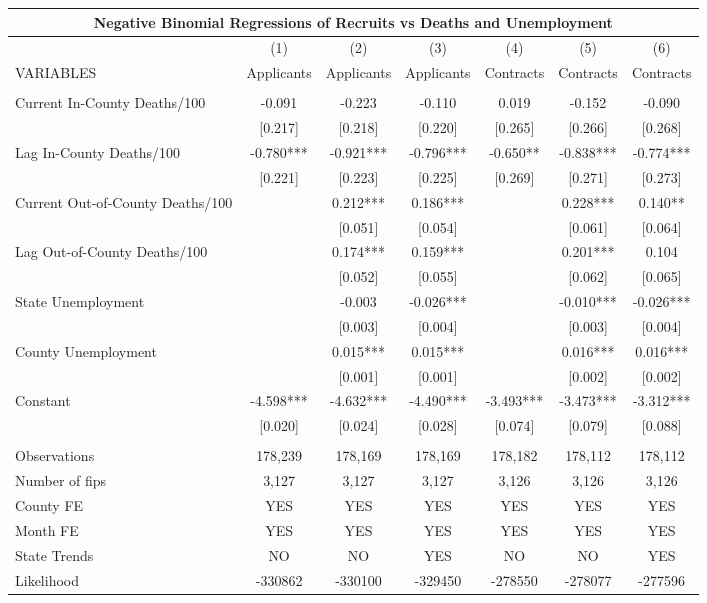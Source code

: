 \documentclass[]{article}
\begin{document}
\begin{tabular}{lcccccc}
\multicolumn{7}{c}{Negative Binomial Regressions of Recruits vs Deaths and Unemployment} \\ \hline
 & (1) & (2) & (3) & (4) & (5) & (6) \\
VARIABLES & Applicants & Applicants & Applicants & Contracts & Contracts & Contracts \\ \hline
 &  &  &  &  &  &  \\
Current In-County Deaths/100 & -0.091 & -0.223 & -0.110 & 0.019 & -0.152 & -0.090 \\
 & [0.217] & [0.218] & [0.220] & [0.265] & [0.266] & [0.268] \\
Lag In-County Deaths/100 & -0.780*** & -0.921*** & -0.796*** & -0.650** & -0.838*** & -0.774*** \\
 & [0.221] & [0.223] & [0.225] & [0.269] & [0.271] & [0.273] \\
Current Out-of-County Deaths/100 &  & 0.212*** & 0.186*** &  & 0.228*** & 0.140** \\
 &  & [0.051] & [0.054] &  & [0.061] & [0.064] \\
Lag Out-of-County Deaths/100 &  & 0.174*** & 0.159*** &  & 0.201*** & 0.104 \\
 &  & [0.052] & [0.055] &  & [0.062] & [0.065] \\
State Unemployment &  & -0.003 & -0.026*** &  & -0.010*** & -0.026*** \\
 &  & [0.003] & [0.004] &  & [0.003] & [0.004] \\
County Unemployment &  & 0.015*** & 0.015*** &  & 0.016*** & 0.016*** \\
 &  & [0.001] & [0.001] &  & [0.002] & [0.002] \\
Constant & -4.598*** & -4.632*** & -4.490*** & -3.493*** & -3.473*** & -3.312*** \\
 & [0.020] & [0.024] & [0.028] & [0.074] & [0.079] & [0.088] \\
 &  &  &  &  &  &  \\
Observations & 178,239 & 178,169 & 178,169 & 178,182 & 178,112 & 178,112 \\
Number of fips & 3,127 & 3,127 & 3,127 & 3,126 & 3,126 & 3,126 \\
County FE & YES & YES & YES & YES & YES & YES \\
Month FE & YES & YES & YES & YES & YES & YES \\
State Trends & NO & NO & YES & NO & NO & YES \\
 Likelihood & -330862 & -330100 & -329450 & -278550 & -278077 & -277596 \\ \hline

\end{tabular}
\end{document}
